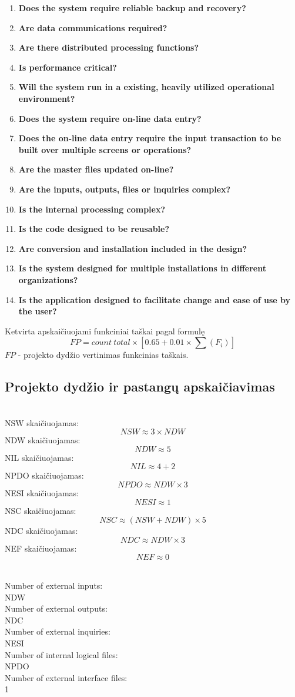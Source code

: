 \documentclass[a4paper,12pt]{article}
\begin{document}
\begin{center}
\begin{enumerate}
\item \textbf{Does the system require reliable backup and recovery?}
\item \textbf{Are data communications required?}
\item \textbf{ Are there distributed processing functions?}
\item \textbf{Is performance critical?}
\item \textbf{Will the system run in a existing, heavily utilized operational environment?}
\item \textbf{Does the system require on-line data entry?}
\item \textbf{Does the on-line data entry require the input transaction to be built over multiple screens or operations?}
\item \textbf{Are the master files updated on-line?}
\item \textbf{Are the inputs, outputs, files or inquiries complex?}
\item \textbf{Is the internal processing complex?}
\item \textbf{Is the code designed to be reusable?}
\item \textbf{Are conversion and installation included in the design?}
\item \textbf{Is the system designed for multiple installations in different organizations?}
\item \textbf{Is the application designed to facilitate change and ease of use by the user?}
\end{enumerate}
Ketvirta apskaičiuojami funkciniai taškai pagal formulę
$$ FP = count\ total \times [0.65 + 0.01 \times \sum(F_i)] $$
$FP$ - projekto dydžio vertinimas funkcinias taškais.

\end{center}

\subsection{Projekto dydžio ir pastangų apskaičiavimas}
\hfill \\
NSW skaičiuojamas:
	$$NSW \approx 3 \times NDW$$
NDW skaičiuojamas:
	$$NDW \approx 5 $$
NIL skaičiuojamas:
	$$NIL \approx 4 + 2 $$
NPDO skaičiuojamas:
	$$NPDO \approx NDW\times 3$$
NESI skaičiuojamas:
	$$NESI \approx 1 $$
NSC skaičiuojamas:
	$$NSC \approx (NSW+NDW)\times 5$$
NDC skaičiuojamas:
	$$NDC \approx NDW\times 3$$
NEF skaičiuojamas:
	$$NEF \approx 0$$


\hfill \\
Number of external inputs:\\
NDW\\
Number of external outputs:\\
NDC\\
Number of external inquiries:\\
NESI\\
Number of internal logical files:\\
NPDO\\
Number of external interface files:\\
1
\end{document}
